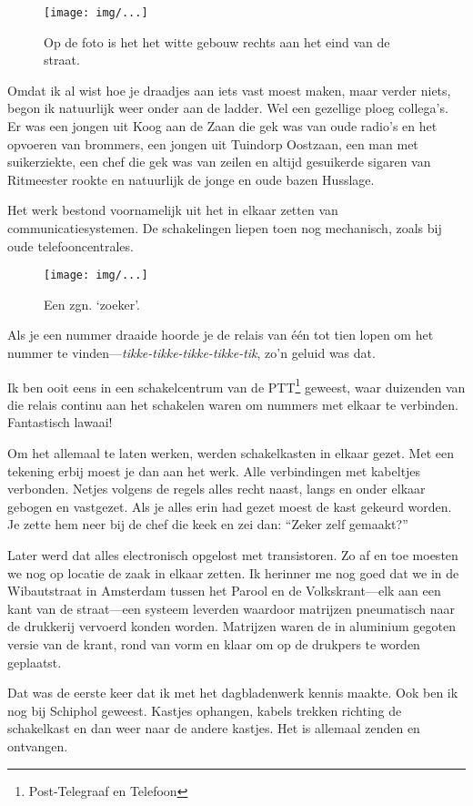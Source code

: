 \documentclass[10pt,twoside,openright]{memoir}
\begin{document}
\begin{figure}[t]
\texttt{[image: img/...]}
\caption{ Op de foto is het het witte gebouw rechts aan het eind van de straat.}
\end{figure}

Omdat ik al wist hoe je draadjes aan iets vast moest maken, maar verder niets, begon ik natuurlijk weer onder aan de ladder. Wel een gezellige ploeg collega’s. Er was een jongen uit Koog aan de Zaan die gek was van oude radio’s en het opvoeren van brommers, een jongen uit Tuindorp Oostzaan, een man met suikerziekte, een chef die gek was van zeilen en altijd gesuikerde sigaren van Ritmeester rookte en natuurlijk de jonge en oude bazen Husslage. 

Het werk bestond voornamelijk uit het in elkaar zetten van communicatiesystemen. De schakelingen liepen toen nog mechanisch, zoals bij oude telefooncentrales. 

\begin{figure}[t]
\texttt{[image: img/...]}
\caption{Een zgn. ‘zoeker’.}
\end{figure}

Als je een nummer draaide hoorde je de relais van één tot tien lopen om het nummer te vinden---\emph{tikke-tikke-tikke-tikke-tik}, zo’n geluid was dat. 

Ik ben ooit eens in een schakelcentrum van de PTT\footnote{Post-Telegraaf en Telefoon} geweest, waar duizenden van die relais continu aan het schakelen waren om nummers met elkaar te verbinden. Fantastisch lawaai! 

Om het allemaal te laten werken, werden schakelkasten in elkaar gezet. Met een tekening erbij moest je dan aan het werk. Alle verbindingen met kabeltjes verbonden. Netjes volgens de regels alles recht naast, langs en onder elkaar gebogen en vastgezet. Als je alles erin had gezet moest de kast gekeurd worden. Je zette hem neer bij de chef die keek en zei dan: ``Zeker zelf gemaakt?''

Later werd dat alles electronisch opgelost met transistoren. Zo af en toe moesten we nog op locatie de zaak in elkaar zetten. Ik herinner me nog goed dat we in de Wibautstraat in Amsterdam tussen het Parool en de Volkskrant---elk aan een kant van de straat---een systeem leverden waardoor matrijzen pneumatisch naar de drukkerij vervoerd konden worden. Matrijzen waren de in aluminium gegoten versie van de krant, rond van vorm en klaar om op de drukpers te worden geplaatst. 

Dat was de eerste keer dat ik met het dagbladenwerk kennis maakte. Ook ben ik nog bij Schiphol geweest. Kastjes ophangen, kabels trekken richting de schakelkast en dan weer naar de andere kastjes. Het is allemaal zenden en ontvangen. 
\end{document}
